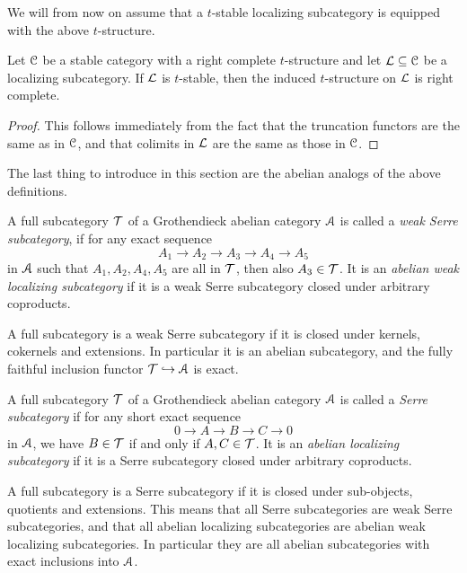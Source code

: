 We will from now on assume that a $t$-stable localizing subcategory is equipped with the above $t$-structure. 

\begin{proposition}
    \label{ch3:prop:induced-t-structure-on-stable-localizing}
    Let $\EuScript{C}$ be a stable category with a right complete $t$-structure and let $\mathcal{L}\subseteq \EuScript{C}$ be a localizing subcategory. If $\mathcal{L}$ is $t$-stable, then the induced $t$-structure on $\mathcal{L}$ is right complete.  
\end{proposition}
\begin{proof}
    This follows immediately from the fact that the truncation functors are the same as in $\EuScript{C}$, and that colimits in $\mathcal{L}$ are the same as those in $\EuScript{C}$. 
\end{proof}

The last thing to introduce in this section are the abelian analogs of the above definitions. 

\begin{definition}
    A full subcategory $\mathcal{T}$ of a Grothendieck abelian category $\EuScript{A}$ is called a \emph{weak Serre subcategory}, if for any exact sequence 
    \[A_1 \to A_2 \to A_3 \to A_4 \to A_5\]
    in $\EuScript{A}$ such that $A_1, A_2, A_4, A_5$ are all in $\mathcal{T}$, then also $A_3 \in \mathcal{T}$. It is an \emph{abelian weak localizing subcategory} if it is a weak Serre subcategory closed under arbitrary coproducts. 
\end{definition}

\begin{remark}
    A full subcategory is a weak Serre subcategory if it is closed under kernels, cokernels and extensions. In particular it is an abelian subcategory, and the fully faithful inclusion functor $\mathcal{T}\hookrightarrow \EuScript{A}$ is exact. 
\end{remark}

\begin{definition}
    A full subcategory $\mathcal{T}$ of a Grothendieck abelian category $\EuScript{A}$ is called a \emph{Serre subcategory} if for any short exact sequence 
    \[0\to A\to B\to C\to 0\]
    in $\EuScript{A}$, we have $B\in \mathcal{T}$ if and only if $A, C \in \mathcal{T}$. It is an \emph{abelian localizing subcategory} if it is a Serre subcategory closed under arbitrary coproducts. 
\end{definition}

\begin{remark}
    A full subcategory is a Serre subcategory if it is closed under sub-objects, quotients and extensions. This means that all Serre subcategories are weak Serre subcategories, and that all abelian localizing subcategories are abelian weak localizing subcategories. In particular they are all abelian subcategories with exact inclusions into $\EuScript{A}$. 
\end{remark}

